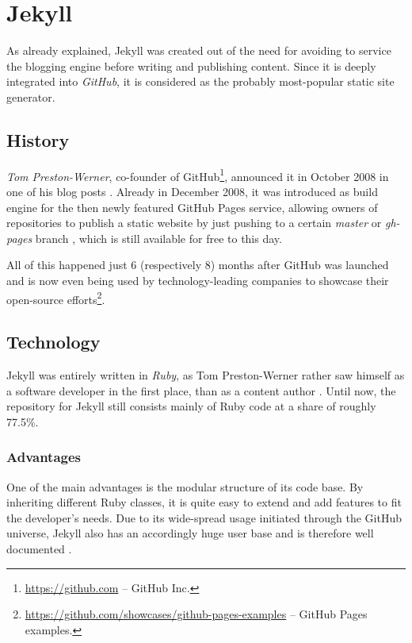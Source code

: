 \section{Jekyll}
\label{sec:jekyll}

As already explained, Jekyll was created out of the need for avoiding to service the blogging engine before writing and publishing content. Since it is deeply integrated into \emph{GitHub}, it is considered as the probably most-popular static site generator.

\subsection{History}
\label{sec:jekyll-history}
\emph{Tom Preston-Werner}, co-founder of GitHub\footnote{\url{https://github.com} -- GitHub Inc.}, announced it in October 2008 in one of his blog posts \cite{PrestonWerner2008jekyll}. Already in December 2008, it was introduced as build engine for the then newly featured GitHub Pages service, allowing owners of repositories to publish a static website by just pushing to a certain \emph{master} or \emph{gh-pages} branch \cite{PrestonWerner2008githubpages}, which is still available for free to this day.

All of this happened just 6 (respectively 8) months after GitHub was launched \cite{PrestonWerner2008githublaunch} and is now even being used by technology-leading companies to showcase their open-source efforts\footnote{\url{https://github.com/showcases/github-pages-examples} -- GitHub Pages examples.}.

\subsection{Technology}
\label{sec:jekyll-technology}
Jekyll was entirely written in \emph{Ruby}, as Tom Preston-Werner rather saw himself as a software developer in the first place, than as a content author \cite{PrestonWerner2008jekyll}. Until now, the repository for Jekyll still consists mainly of Ruby code at a share of roughly 77.5\%.

\subsubsection{Advantages}
One of the main advantages is the modular structure of its code base. By inheriting different Ruby classes, it is quite easy to extend and add features to fit the developer's needs. Due to its wide-spread usage initiated through the GitHub universe, Jekyll also has an accordingly huge user base and is therefore well documented \cite[26]{dhillon2016}.

